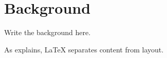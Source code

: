 \chapter{Background}\label{ch:background}

Write the background here.

As \textcite{lamport1994} explains, \LaTeX{} separates content from layout.
